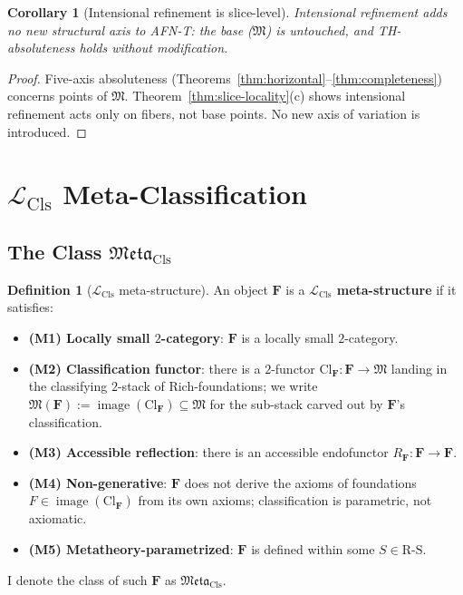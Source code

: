 \documentclass[11pt]{article}
\theoremstyle{plain}
\newtheorem{corollary}[theorem]{Corollary}
\theoremstyle{definition}
\newtheorem{definition}[theorem]{Definition}
\newcommand{\RS}{\mathrm{R\text{-}S}}
\newcommand{\fM}{\mathfrak{M}}
\newcommand{\Meta}{\mathfrak{Meta}}
\newcommand{\LCls}{\mathcal{L}_{\mathrm{Cls}}}
\newcommand{\Cl}{\mathrm{Cl}}
\DeclareMathOperator{\image}{image}
\begin{document}
\begin{corollary}[Intensional refinement is slice-level]\label{cor:slice-level}
Intensional refinement adds no new structural axis to AFN-T: the base ($\fM$) is untouched, and TH-absoluteness holds without modification.
\end{corollary}

\begin{proof}
Five-axis absoluteness (Theorems~\ref{thm:horizontal}--\ref{thm:completeness}) concerns points of $\fM$. Theorem~\ref{thm:slice-locality}(c) shows intensional refinement acts only on fibers, not base points. No new axis of variation is introduced.
\end{proof}

\section{\texorpdfstring{$\LCls$ Meta-Classification}{Classifier Meta-Classification}}\label{sec:meta}

\subsection{\texorpdfstring{The Class $\Meta_{\mathrm{Cls}}$}{The Class Meta\_5+}}

\begin{definition}[$\LCls$ meta-structure]\label{def:meta}
An object $\mathbf{F}$ is a \textbf{$\LCls$ meta-structure} if it satisfies:
\begin{itemize}
\item \textbf{(M1) Locally small $2$-category}: $\mathbf{F}$ is a locally small $2$-category.
\item \textbf{(M2) Classification functor}: there is a $2$-functor $\Cl_{\mathbf{F}} : \mathbf{F} \to \fM$ landing in the classifying $2$-stack of Rich-foundations; we write $\fM(\mathbf{F}) := \image(\Cl_{\mathbf{F}}) \subseteq \fM$ for the sub-stack carved out by $\mathbf{F}$'s classification.
\item \textbf{(M3) Accessible reflection}: there is an accessible endofunctor $R_{\mathbf{F}} : \mathbf{F} \to \mathbf{F}$.
\item \textbf{(M4) Non-generative}: $\mathbf{F}$ does not derive the axioms of foundations $F \in \image(\Cl_{\mathbf{F}})$ from its own axioms; classification is parametric, not axiomatic.
\item \textbf{(M5) Metatheory-parametrized}: $\mathbf{F}$ is defined within some $S \in \RS$.
\end{itemize}
I denote the class of such $\mathbf{F}$ as $\Meta_{\mathrm{Cls}}$.
\end{definition}
\end{document}
